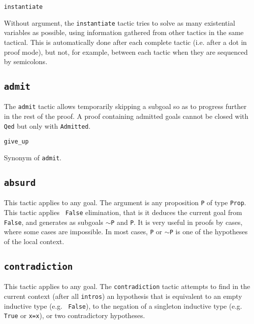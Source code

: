 \begin{coq_example*}
\begin{Variants}
  \item {\tt instantiate}

    Without argument, the {\tt instantiate} tactic tries to solve as
    many existential variables as possible, using information gathered
    from other tactics in the same tactical. This is automatically
    done after each complete tactic (i.e. after a dot in proof mode),
    but not, for example, between each tactic when they are sequenced
    by semicolons.

\end{Variants}

\subsection{\tt admit}
\label{admit}

The {\tt admit} tactic allows temporarily skipping a subgoal so as to
progress further in the rest of the proof.  A proof containing
admitted goals cannot be closed with {\tt Qed} but only with
{\tt Admitted}.

\begin{Variants}

  \item {\tt give\_up}

    Synonym of {\tt admit}.

\end{Variants}

\subsection{\tt absurd \term}
\label{absurd}

This tactic applies to any goal. The argument {\term} is any
proposition {\tt P} of type {\tt Prop}. This tactic applies {\tt
  False} elimination, that is it deduces the current goal from {\tt
  False}, and generates as subgoals {\tt $\sim$P} and {\tt P}. It is
very useful in proofs by cases, where some cases are impossible. In
most cases, \texttt{P} or $\sim$\texttt{P} is one of the hypotheses of
the local context.

\subsection{\tt contradiction}
\label{contradiction}

This tactic applies to any goal. The {\tt contradiction} tactic
attempts to find in the current context (after all {\tt intros}) an
hypothesis that is equivalent to an empty inductive type (e.g. {\tt
  False}), to the negation of a singleton inductive type (e.g. {\tt
  True} or {\tt x=x}), or two contradictory hypotheses.


\end{coq_example*}
